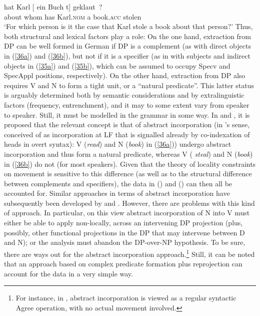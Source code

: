 \documentclass[output=paper
,modfonts
,nonflat]{langsci/langscibook}
\begin{document}
	\ea\label{ex:mueller:38}
	\ex
		\gll*{} \label{36b}hat Karl [ ein Buch t] geklaut~?\\
		{} about whom has Karl.{\scshape nom} {} a book.{\scshape acc} {} stolen\\
		\glt `For which person is it the case that Karl stole a book about that person?'
	\z
	\z
	Thus, both structural and lexical factors play a role: On the one
	hand, extraction from DP can be well formed in German if DP is a complement
	(as with direct objects in (\ref{36a}) and (\ref{36b}), but not if it is a specifier (as in
	with subjects and indirect objects in (\ref{35a}) and (\ref{35b}), which can be assumed
	to occupy Specv and SpecAppl positions, respectively). On the other
	hand, extraction from DP also requires V and N to form a tight unit,
	or a ``natural predicate''. This latter status is arguably determined
	both by semantic considerations and by extralinguistic factors
	(frequency, entrenchment), and it may to some extent vary from speaker
	to speaker. Still, it must be modelled in the grammar in some way. In
	\citet{Mueller:91:abs} and \citet{MuellerSternefeld:95}, it is proposed
	that the relevant concept is that of abstract incorporation (in
	\citealt{Baker:88}'s sense, conceived of as incorporation at LF that
	is signalled already by co-indexation of heads in overt syntax): V
	({\itshape read}) and N ({\itshape book}) in (\ref{36a})) undergo abstract
	incorporation and thus form a natural predicate, whereas V ({\it
		steal}) and N ({\itshape book}) in (\ref{36b}) do not (for most speakers). Given that
	the theory of locality constraints on movement is sensitive to this
	difference (as well as to the structural difference between
	complements and specifiers), the data in (\LLast) and (\Last) can then all
	be accounted for. Similar approaches in terms of abstract
	incorporation have subsequently been developed by
	\citet{DaviesDubinsky:03} and \citet{Schmellentin:06}. However, there
	are problems with this kind of approach. In particular, on this view
	abstract incorporation of N into V must either be able to apply
	non-locally, across an intervening DP projection (plus, possibly,
	other functional projections in the DP that may intervene between D
	and N); or the analysis must abandon the DP-over-NP hypothesis. To be
	sure, there are ways out for the abstract incorporation
	approach.\footnote{For instance, in \citet{Mueller:11:loc}, abstract incorporation is
		viewed as a regular syntactic Agree operation, with no actual
		movement involved.} Still, it can be noted that an approach based on
	complex predicate formation plus reprojection can account for the data
	in a very simple way. 
	
\end{document}
